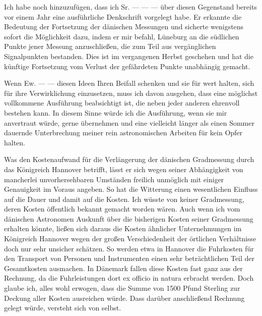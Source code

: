\par
{}%
Ich habe noch hinzuzufügen, dass ich Sr. — — — über diesen Gegenstand bereits vor einem Jahr eine ausführliche Denkschrift vorgelegt habe. Er erkannte die Bedeutung der Fortsetzung der dänischen Messungen und sicherte wenigstens sofort die Möglichkeit dazu, indem er mir befahl, Lüneburg an die südlichen Punkte jener Messung anzuschließen, die zum Teil aus vergänglichen Signalpunkten bestanden. Dies ist im vergangenen Herbst geschehen und hat die künftige Fortsetzung vom Verlust der gefährdeten Punkte unabhängig gemacht.

Wenn Ew. — — diesen Ideen Ihren Beifall schenken und sie für wert halten, sich für ihre Verwirklichung einzusetzen, muss ich davon ausgehen, dass eine möglichst vollkommene Ausführung beabsichtigt ist, die neben jeder anderen ehrenvoll bestehen kann. In diesem Sinne würde ich die Ausführung, wenn sie mir anvertraut würde, gerne übernehmen und eine vielleicht länger als einen Sommer dauernde Unterbrechung meiner rein astronomischen Arbeiten für kein Opfer halten.

Was den Kostenaufwand für die Verlängerung der dänischen Gradmessung durch das Königreich Hannover betrifft, lässt er sich wegen seiner Abhängigkeit von mancherlei unvorhersehbaren Umständen freilich unmöglich mit einiger Genauigkeit im Voraus angeben. So hat die Witterung einen wesentlichen Einfluss auf die Dauer und damit auf die Kosten. Ich wüsste von keiner Gradmessung, deren Kosten öffentlich bekannt gemacht worden wären. Auch wenn ich vom dänischen Astronomen Auskunft über die bisherigen Kosten seiner Gradmessung erhalten könnte, ließen sich daraus die Kosten ähnlicher Unternehmungen im Königreich Hannover wegen der großen Verschiedenheit der örtlichen Verhältnisse doch nur sehr unsicher schätzen. So werden etwa in Hannover die Fuhrkosten für den Transport von Personen und Instrumenten einen sehr beträchtlichen Teil der Gesamtkosten ausmachen. In Dänemark fallen diese Kosten fast ganz aus der Rechnung, da die Fuhrleistungen dort ex officio in natura erbracht werden. Doch glaube ich, alles wohl erwogen, dass die Summe von 1500 Pfund Sterling zur Deckung aller Kosten ausreichen würde. Dass darüber anschließend Rechnung gelegt würde, versteht sich von selbst.

